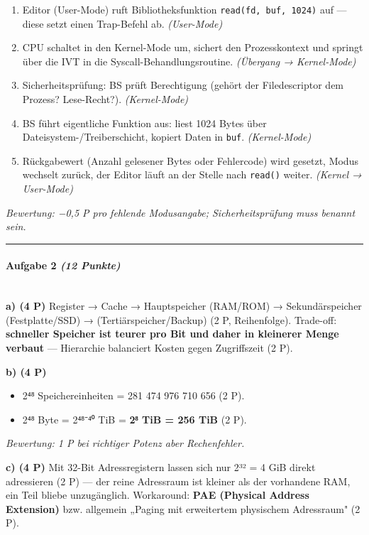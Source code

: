\documentclass[11pt, a4paper]{article}
\begin{document}
\begin{enumerate}
  \item Editor (User-Mode) ruft Bibliotheksfunktion \texttt{read(fd, buf, 1024)} auf — diese setzt einen Trap-Befehl ab. \textit{(User-Mode)}
  \item CPU schaltet in den Kernel-Mode um, sichert den Prozesskontext und springt über die IVT in die Syscall-Behandlungsroutine. \textit{(Übergang → Kernel-Mode)}
  \item Sicherheitsprüfung: BS prüft Berechtigung (gehört der Filedescriptor dem Prozess? Lese-Recht?). \textit{(Kernel-Mode)}
  \item BS führt eigentliche Funktion aus: liest 1024 Bytes über Dateisystem-/Treiberschicht, kopiert Daten in \texttt{buf}. \textit{(Kernel-Mode)}
  \item Rückgabewert (Anzahl gelesener Bytes oder Fehlercode) wird gesetzt, Modus wechselt zurück, der Editor läuft an der Stelle nach \texttt{read()} weiter. \textit{(Kernel → User-Mode)}
\end{enumerate}
\textit{Bewertung: −0,5 P pro fehlende Modusangabe; Sicherheitsprüfung muss benannt sein.}



\noindent\textcolor{rulegray}{\rule{\linewidth}{0.4pt}}


\paragraph{Aufgabe 2 \textit{(12 Punkte)}}\mbox{}\\[2pt]

\textbf{a) (4 P)} Register → Cache → Hauptspeicher (RAM/ROM) → Sekundärspeicher (Festplatte/SSD) → (Tertiärspeicher/Backup) (2 P, Reihenfolge). Trade-off: \textbf{schneller Speicher ist teurer pro Bit und daher in kleinerer Menge verbaut} — Hierarchie balanciert Kosten gegen Zugriffszeit (2 P).


\textbf{b) (4 P)}

\begin{itemize}
  \item 2⁴⁸ Speichereinheiten = 281 474 976 710 656 (2 P).
  \item 2⁴⁸ Byte = 2⁴⁸⁻⁴⁰ TiB = \textbf{2⁸ TiB = 256 TiB} (2 P).
\end{itemize}

\textit{Bewertung: 1 P bei richtiger Potenz aber Rechenfehler.}


\textbf{c) (4 P)} Mit 32-Bit Adressregistern lassen sich nur 2³² = 4 GiB direkt adressieren (2 P) — der reine Adressraum ist kleiner als der vorhandene RAM, ein Teil bliebe unzugänglich. Workaround: \textbf{PAE (Physical Address Extension)} bzw. allgemein „Paging mit erweitertem physischem Adressraum" (2 P).
\end{document}
